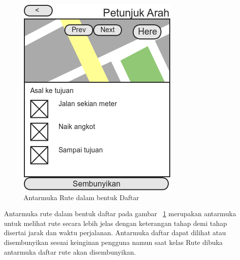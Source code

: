 \begin{figure}[h]
	\centering
		\includegraphics[scale=0.6]{Gambar/perancangan_antarmuka/ListRoute}
	\caption{Antarmuka Rute dalam bentuk Daftar}
	\label{fig:Antarmuka listRoute}
\end{figure}

\hspace{0.5cm} Antarmuka rute dalam bentuk daftar pada gambar ~\ref{fig:Antarmuka listRoute} merupakan antarmuka untuk melihat rute secara lebih jelas dengan keterangan tahap demi tahap disertai jarak dan waktu perjalanan. Antarmuka daftar dapat dilihat atau disembunyikan sesuai keinginan pengguna namun saat kelas Rute dibuka antarmuka daftar rute akan disembunyikan.